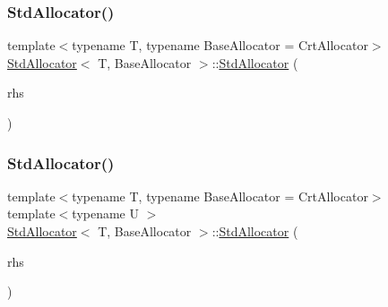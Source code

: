 \mbox{\label{classStdAllocator_abfb16c76a06015f0ec1abe704375ace8}} 
\subsubsection{\texorpdfstring{Std\+Allocator()}{StdAllocator()}\hspace{0.1cm}{\footnotesize\ttfamily [2/4]}}
{\footnotesize\ttfamily template$<$typename T, typename Base\+Allocator = Crt\+Allocator$>$ \\
\hyperlink{classStdAllocator}{Std\+Allocator}$<$ T, Base\+Allocator $>$\+::\hyperlink{classStdAllocator}{Std\+Allocator} (\begin{DoxyParamCaption}\item[{const \hyperlink{classStdAllocator}{Std\+Allocator}$<$ T, Base\+Allocator $>$ \&}]{rhs }\end{DoxyParamCaption})\hspace{0.3cm}{\ttfamily [inline]}}

\mbox{\label{classStdAllocator_ab41a5cbaf54473e1e10468258629bd1b}} 
\subsubsection{\texorpdfstring{Std\+Allocator()}{StdAllocator()}\hspace{0.1cm}{\footnotesize\ttfamily [3/4]}}
{\footnotesize\ttfamily template$<$typename T, typename Base\+Allocator = Crt\+Allocator$>$ \\
template$<$typename U $>$ \\
\hyperlink{classStdAllocator}{Std\+Allocator}$<$ T, Base\+Allocator $>$\+::\hyperlink{classStdAllocator}{Std\+Allocator} (\begin{DoxyParamCaption}\item[{const \hyperlink{classStdAllocator}{Std\+Allocator}$<$ U, Base\+Allocator $>$ \&}]{rhs }\end{DoxyParamCaption})\hspace{0.3cm}{\ttfamily [inline]}}

\mbox{\label{classStdAllocator_a40ffe84a544bd5fe938581d09595bd1f}} 
